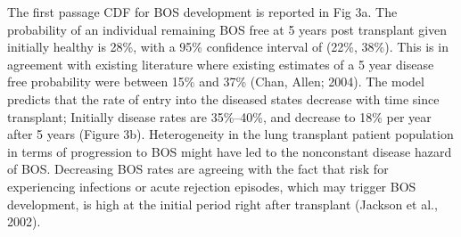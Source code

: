 \documentclass{uwstat572}
\begin{document}
The first passage CDF for BOS development is reported in Fig 3a. The probability of an individual remaining BOS free at 5 years post transplant given initially healthy is 28\%, with a 95\% confidence interval of (22\%, 38\%). This is in agreement with existing literature where existing estimates of a 5 year disease free probability were between 15\% and 37\% (Chan, Allen; 2004). The model predicts that the rate of entry into the diseased states decrease with time since transplant; Initially disease rates are 35\%–40\%, and decrease to 18\% per year after 5 years (Figure 3b). Heterogeneity in the lung transplant patient population in terms of progression to BOS might have led to the nonconstant disease hazard of BOS. Decreasing BOS rates are agreeing with the fact that risk for experiencing infections or acute rejection episodes, which may trigger BOS development, is high at the initial period right after transplant (Jackson et al., 2002).
\end{document}
